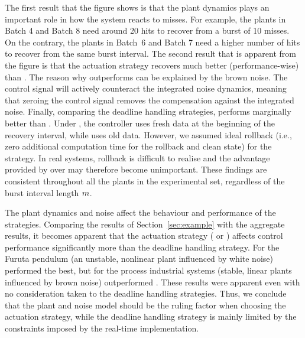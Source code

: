 The first result that the figure shows is that the plant dynamics plays an important role in how the system reacts to misses.
For example, the plants in Batch 4 and Batch 8 need around 20 hits to recover from a burst of 10 misses.
On the contrary, the plants in Batch~6 and Batch 7 need a higher number of hits to recover from the same burst interval.
The second result that is apparent from the figure is that the \tH{} actuation strategy recovers much better (performance-wise) than \tZ{}.
The reason why \tH{} outperforms \tZ{} can be explained by the brown noise.
The control signal will actively counteract the integrated noise dynamics, meaning that zeroing the control signal removes the compensation against the integrated noise.
%
Finally, comparing the deadline handling strategies, \tK{} performs marginally better than \tS{}.
Under \tK{}, the controller uses fresh data at the beginning of the recovery interval, while \tS{} uses old data.
However, we assumed ideal rollback (i.e., zero additional computation time for the rollback and clean state) for the \tK{} strategy.
In real systems, rollback is difficult to realise and the advantage provided by \tK{} over \tS{} may therefore become unimportant.
%
These findings are consistent throughout all the plants in the experimental set, regardless of the burst interval length $m$.

The plant dynamics and noise affect the behaviour and performance of the strategies.
Comparing the results of Section~\ref{sec:example} with the aggregate results, it becomes apparent that the actuation strategy (\tZ{} or \tH{}) affects control performance significantly more than the deadline handling strategy.
For the Furuta pendulum (an unstable, nonlinear plant influenced by white noise) \tZ{} performed the best, but for the process industrial systems (stable, linear plants influenced by brown noise) \tH{} outperformed \tZ{}.
These results were apparent even with no consideration taken to the deadline handling strategies.
Thus, we conclude that the plant and noise model should be the ruling factor when choosing the actuation strategy, while the deadline handling strategy is mainly limited by the constraints imposed by the real-time implementation.
